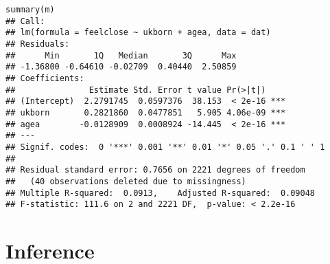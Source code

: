 \begin{frame}[fragile]

\footnotesize

\begin{verbatim}
summary(m)
## Call:
## lm(formula = feelclose ~ ukborn + agea, data = dat)
## Residuals:
##      Min       1Q   Median       3Q      Max 
## -1.36800 -0.64610 -0.02709  0.40440  2.50859 
## Coefficients:
##               Estimate Std. Error t value Pr(>|t|)    
## (Intercept)  2.2791745  0.0597376  38.153  < 2e-16 ***
## ukborn       0.2821860  0.0477851   5.905 4.06e-09 ***
## agea        -0.0128909  0.0008924 -14.445  < 2e-16 ***
## ---
## Signif. codes:  0 '***' 0.001 '**' 0.01 '*' 0.05 '.' 0.1 ' ' 1
## 
## Residual standard error: 0.7656 on 2221 degrees of freedom
##   (40 observations deleted due to missingness)
## Multiple R-squared:  0.0913,    Adjusted R-squared:  0.09048 
## F-statistic: 111.6 on 2 and 2221 DF,  p-value: < 2.2e-16
\end{verbatim}

\end{frame}





\section{Inference}
\frame{\tableofcontents[currentsection]}



